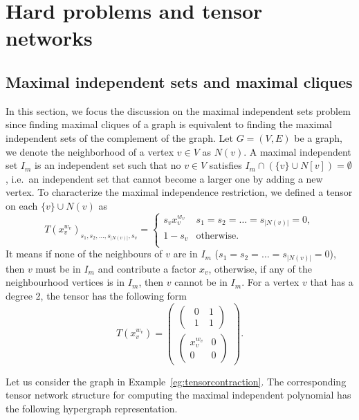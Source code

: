 \documentclass[onefignum, onetabnum]{siamart190516}
\newcommand{\<}{\langle}
\renewcommand{\>}{\rangle}
\begin{document}
\section{Hard problems and tensor networks}\label{sec:otherproblems}
\subsection{Maximal independent sets and maximal cliques}\label{sec:maximal}
In this section, we focus the discussion on the maximal independent sets problem since finding maximal cliques of a graph is equivalent to finding the maximal independent sets of the complement of the graph.
Let $G=(V,E)$ be a graph, we denote the neighborhood of a vertex $v\in V$ as $N(v)$.
A maximal independent set $I_m$ is an independent set such that no $v \in V$ satisfies $I_m \cap (\{v\} \cup N[v])  = \emptyset$, i.e.\ an independent set that cannot become a larger one by adding a new vertex.
To characterize the maximal independence restriction, we defined a tensor on each $\{v\}\cup N(v)$ as
\begin{equation}\label{eq:maximal}
    T(x_v^{w_v})_{s_1,s_2,\ldots,s_{|N(v)|},s_v} = \begin{cases}
        s_vx_v^{w_v} & s_1=s_2=\ldots=s_{|N(v)|}=0,\\
        1-s_v& \text{otherwise}.\\
    \end{cases}
\end{equation}
It means if none of the neighbours of $v$ are in $I_{m}$ ($ s_1=s_2=\ldots=s_{|N(v)|}=0$), then $v$ must be in $I_{m}$ and contribute a factor $x_{v}$, otherwise, if any of the neighbourhood vertices is in $I_{m}$, then $v$ cannot be in $I_{m}$.
For a vertex $v$ that has a degree 2, the tensor has the following form
\begin{equation}
    T(x_v^{w_v})=\left(\begin{matrix}
    \left(\begin{matrix}
        ~~0 &~1 \\
        ~~1 &~1
    \end{matrix}\right)\\
    \left(\begin{matrix}
        x_v^{w_v} &0 \\
        0 &0
    \end{matrix}\right)
    \end{matrix}\right).
\end{equation}
 
Let us consider the graph in Example~\ref{eg:tensorcontraction}. The corresponding tensor network structure for computing the maximal independent polynomial has the following hypergraph representation. \\
\end{document}

